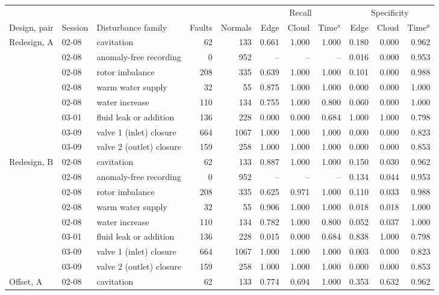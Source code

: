 \begin{tabular}{@{}l l l rr rrr rrr@{}}
\toprule
& & & & & \multicolumn{3}{c}{Recall} & \multicolumn{3}{c}{Specificity} \\
\cmidrule(lr){6-8}\cmidrule(l){9-11}
Design, pair & Session & Disturbance family & Faults & Normals & Edge & Cloud & Time$^{a}$ & Edge & Cloud & Time$^{a}$ \\
\midrule
Redesign, A & 02-08 & cavitation & 62 & 133 & 0.661 & 1.000 & 1.000 & 0.180 & 0.000 & 0.962 \\
 & 02-08 & anomaly-free recording & 0 & 952 & -- & -- & -- & 0.016 & 0.000 & 0.953 \\
 & 02-08 & rotor imbalance & 208 & 335 & 0.639 & 1.000 & 1.000 & 0.101 & 0.000 & 0.988 \\
 & 02-08 & warm water supply & 32 & 55 & 0.875 & 1.000 & 1.000 & 0.000 & 0.000 & 1.000 \\
 & 02-08 & water increase & 110 & 134 & 0.755 & 1.000 & 0.800 & 0.060 & 0.000 & 1.000 \\
 & 03-01 & fluid leak or addition & 136 & 228 & 0.000 & 0.000 & 0.684 & 1.000 & 1.000 & 0.798 \\
 & 03-09 & valve 1 (inlet) closure & 664 & 1067 & 1.000 & 1.000 & 1.000 & 0.000 & 0.000 & 0.823 \\
 & 03-09 & valve 2 (outlet) closure & 159 & 258 & 1.000 & 1.000 & 1.000 & 0.000 & 0.000 & 0.853 \\
Redesign, B & 02-08 & cavitation & 62 & 133 & 0.887 & 1.000 & 1.000 & 0.150 & 0.030 & 0.962 \\
 & 02-08 & anomaly-free recording & 0 & 952 & -- & -- & -- & 0.134 & 0.044 & 0.953 \\
 & 02-08 & rotor imbalance & 208 & 335 & 0.625 & 0.971 & 1.000 & 0.110 & 0.033 & 0.988 \\
 & 02-08 & warm water supply & 32 & 55 & 0.906 & 1.000 & 1.000 & 0.018 & 0.018 & 1.000 \\
 & 02-08 & water increase & 110 & 134 & 0.782 & 1.000 & 0.800 & 0.052 & 0.037 & 1.000 \\
 & 03-01 & fluid leak or addition & 136 & 228 & 0.015 & 0.000 & 0.684 & 0.838 & 1.000 & 0.798 \\
 & 03-09 & valve 1 (inlet) closure & 664 & 1067 & 1.000 & 1.000 & 1.000 & 0.003 & 0.000 & 0.823 \\
 & 03-09 & valve 2 (outlet) closure & 159 & 258 & 1.000 & 1.000 & 1.000 & 0.000 & 0.000 & 0.853 \\
Offset, A & 02-08 & cavitation & 62 & 133 & 0.774 & 0.694 & 1.000 & 0.353 & 0.632 & 0.962 \\

\end{tabular}
